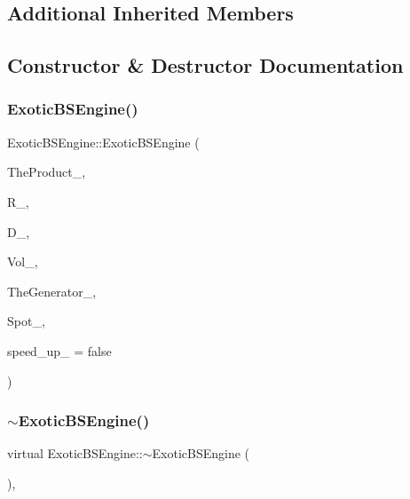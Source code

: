 \subsection*{Additional Inherited Members}


\subsection{Constructor \& Destructor Documentation}
\hypertarget{classExoticBSEngine_a8a54a128a72a82acfa40e6f144775350}{}\label{classExoticBSEngine_a8a54a128a72a82acfa40e6f144775350} 
\subsubsection{\texorpdfstring{Exotic\+B\+S\+Engine()}{ExoticBSEngine()}}
{\footnotesize\ttfamily Exotic\+B\+S\+Engine\+::\+Exotic\+B\+S\+Engine (\begin{DoxyParamCaption}\item[{const \hyperlink{classWrapper}{Wrapper}$<$ \hyperlink{classPathDependent}{Path\+Dependent} $>$ \&}]{The\+Product\+\_\+,  }\item[{const \hyperlink{classParameters}{Parameters} \&}]{R\+\_\+,  }\item[{const \hyperlink{classParameters}{Parameters} \&}]{D\+\_\+,  }\item[{const \hyperlink{classParameters}{Parameters} \&}]{Vol\+\_\+,  }\item[{const \hyperlink{classWrapper}{Wrapper}$<$ \hyperlink{classRandomBase}{Random\+Base} $>$ \&}]{The\+Generator\+\_\+,  }\item[{double}]{Spot\+\_\+,  }\item[{bool}]{speed\+\_\+up\+\_\+ = {\ttfamily false} }\end{DoxyParamCaption})}

\hypertarget{classExoticBSEngine_a7c957a183892ed4cb5cf5f8969070921}{}\label{classExoticBSEngine_a7c957a183892ed4cb5cf5f8969070921} 
\subsubsection{\texorpdfstring{$\sim$\+Exotic\+B\+S\+Engine()}{~ExoticBSEngine()}}
{\footnotesize\ttfamily virtual Exotic\+B\+S\+Engine\+::$\sim$\+Exotic\+B\+S\+Engine (\begin{DoxyParamCaption}{ }\end{DoxyParamCaption})\hspace{0.3cm}{\ttfamily [inline]}, {\ttfamily [virtual]}}



